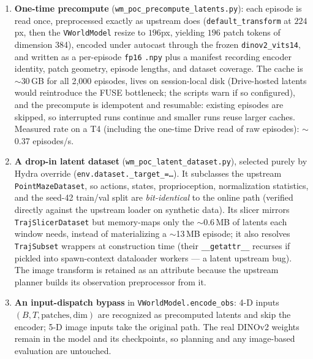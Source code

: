 \documentclass[11pt]{article}
\begin{document}
\begin{enumerate}
\item \textbf{One-time precompute}
      (\texttt{wm\_poc\_precompute\_latents.py}): each episode is read once,
      preprocessed exactly as upstream does (\texttt{default\_transform} at
      $224$px, then the \texttt{VWorldModel} resize to $196$px, yielding
      $196$ patch tokens of dimension 384), encoded under autocast through
      the frozen \texttt{dinov2\_vits14}, and written as a per-episode
      \texttt{fp16} \texttt{.npy} plus a manifest recording encoder identity,
      patch geometry, episode lengths, and dataset coverage. The cache is
      $\sim$30\,GB for all 2{,}000 episodes, lives on session-local disk
      (Drive-hosted latents would reintroduce the FUSE bottleneck; the
      scripts warn if so configured), and the precompute is idempotent and
      resumable: existing episodes are skipped, so interrupted runs continue
      and smaller runs reuse larger caches. Measured rate on a T4 (including
      the one-time Drive read of raw episodes): $\sim$0.37 episodes/s.
\item \textbf{A drop-in latent dataset}
      (\texttt{wm\_poc\_latent\_dataset.py}), selected purely by Hydra
      override (\texttt{env.dataset.\_target\_=\ldots}). It subclasses the
      upstream \texttt{PointMazeDataset}, so actions, states,
      proprioception, normalization statistics, and the seed-42 train/val
      split are \emph{bit-identical} to the online path (verified directly
      against the upstream loader on synthetic data). Its slicer mirrors
      \texttt{TrajSlicerDataset} but memory-maps only the $\sim$0.6\,MB of
      latents each window needs, instead of materializing a $\sim$13\,MB
      episode; it also resolves \texttt{TrajSubset} wrappers at construction
      time (their \texttt{\_\_getattr\_\_} recurses if pickled into
      spawn-context dataloader workers --- a latent upstream bug). The image
      transform is retained as an attribute because the upstream planner
      builds its observation preprocessor from it.
\item \textbf{An input-dispatch bypass} in
      \texttt{VWorldModel.encode\_obs}: 4-D inputs
      $(B,T,\text{patches},\text{dim})$ are recognized as precomputed
      latents and skip the encoder; 5-D image inputs take the original path.
      The real DINOv2 weights remain in the model and its checkpoints, so
      planning and any image-based evaluation are untouched.
\end{enumerate}
\end{document}
